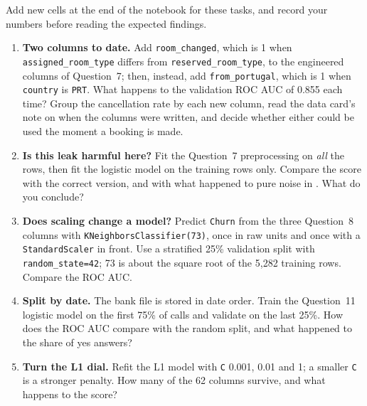 \begin{yourturn}
Add new cells at the end of the notebook for these tasks, and record your numbers before reading the expected findings.
\begin{enumerate}
  \item \textbf{Two columns to date.} Add \texttt{room\_changed}, which is 1 when \texttt{assigned\_room\_type} differs from \texttt{reserved\_room\_type}, to the engineered columns of Question~7; then, instead, add \texttt{from\_portugal}, which is 1 when \texttt{country} is \texttt{PRT}. What happens to the validation ROC AUC of 0.855 each time? Group the cancellation rate by each new column, read the data card's note on when the columns were written, and decide whether either could be used the moment a booking is made.
  \item \textbf{Is this leak harmful here?} Fit the Question~7 preprocessing on \emph{all} the rows, then fit the logistic model on the training rows only. Compare the score with the correct version, and with what happened to pure noise in . What do you conclude?
  \item \textbf{Does scaling change a model?} Predict \texttt{Churn} from the three Question~8 columns with \texttt{KNeighborsClassifier(73)}, once in raw units and once with a \texttt{StandardScaler} in front. Use a stratified 25\% validation split with \texttt{random\_state=42}; 73 is about the square root of the 5,282 training rows. Compare the ROC AUC.
  \item \textbf{Split by date.} The bank file is stored in date order. Train the Question~11 logistic model on the first 75\% of calls and validate on the last 25\%. How does the ROC AUC compare with the random split, and what happened to the share of yes answers?
  \item \textbf{Turn the L1 dial.} Refit the L1 model with \texttt{C} 0.001, 0.01 and 1; a smaller \texttt{C} is a stronger penalty. How many of the 62 columns survive, and what happens to the score?
\end{enumerate}
\end{yourturn}

